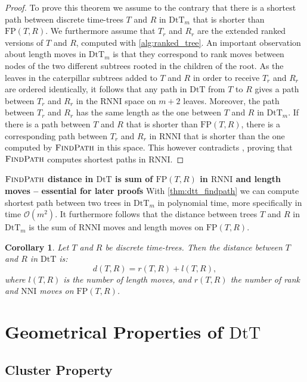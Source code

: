 \documentclass[11pt]{amsart}
\newtheorem{corollary}{Corollary}
\newcommand{\rnni}{\mathrm{RNNI}}
\newcommand{\findpath}{\textsc{FindPath}}
\newcommand{\nni}{\mathrm{NNI}}
\newcommand{\fp}{\mathrm{FP}}
\newcommand{\dtt}{\mathrm{DtT}}
\renewcommand{\O}{\mathcal O}
\newcommand{\summary}[1]{\textbf{#1}} %
\begin{document}
\begin{proof}
	To prove this theorem we assume to the contrary that there is a shortest path between discrete time-trees $T$ and $R$ in $\dtt_m$ that is shorter than $\fp(T,R)$.
	We furthermore assume that $T_r$ and $R_r$ are the extended ranked versions of $T$ and $R$, computed with \autoref{alg:ranked_tree}.
	An important observation about length moves in $\dtt_m$ is that they correspond to rank moves between nodes of the two different subtrees rooted in the children of the root.
	As the leaves in the caterpillar subtrees added to $T$ and $R$ in order to receive $T_r$ and $R_r$ are ordered identically, it follows that any path in $\dtt$ from $T$ to $R$ gives a path between $T_r$ and $R_r$ in the $\rnni$ space on $m+2$ leaves.
	Moreover, the path between $T_r$ and $R_r$ has the same length as the one between $T$ and $R$ in $\dtt_m$.
	If there is a path between $T$ and $R$ that is shorter than $\fp(T,R)$, there is a corresponding path between $T_r$ and $R_r$ in $\rnni$ that is shorter than the one computed by $\findpath$ in this space.
	This however contradicts \autocite[Theorem 1]{Collienne2020-iu}, proving that $\findpath$ computes shortest paths in $\rnni$.
\end{proof}

\summary{$\findpath$ distance in $\dtt$ is sum of $\fp(T,R)$ in $\rnni$ and length moves -- essential for later proofs}
With \autoref{thm:dtt_findpath} we can compute shortest path between two trees in $\dtt_m$ in polynomial time, more specifically in time $\O(m^2)$.
It furthermore follows that the distance between trees $T$ and $R$ in $\dtt_m$ is the sum of $\rnni$ moves and length moves on $\fp(T,R)$.

\begin{corollary}
	Let $T$ and $R$ be discrete time-trees.
	Then the distance between $T$ and $R$ in $\dtt$ is:
	\[d(T,R) = r(T,R) + l(T,R),\]
	where $l(T,R)$ is the number of length moves, and $r(T,R)$ the number of rank and $\nni$ moves on $\fp(T,R)$.
\end{corollary}


\section{Geometrical Properties of $\dtt$}

\subsection{Cluster Property}
\end{document}
